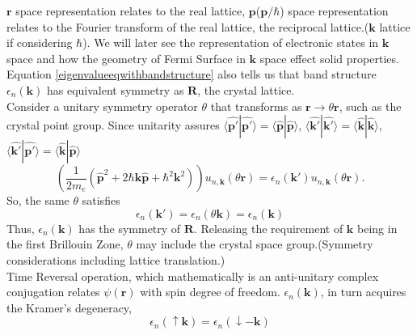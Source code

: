\documentclass{article}
\begin{document}
$\mathbf{r}$ space representation relates to the real lattice, $\mathbf{p}$($\mathbf{p}/\hbar$) space representation relates to  the Fourier transform of the real lattice, the reciprocal lattice.($\mathbf{k}$ lattice if considering $\hbar$). We will later see the representation of electronic states in $\mathbf{k}$ space and how the geometry of Fermi Surface in $\mathbf{k}$ space effect solid properties.\\
Equation \eqref{eigenvalueeqwithbandstructure} also tells us that band structure $\epsilon_{n}(\mathbf{k})$ has equivalent symmetry as $\mathbf{R}$, the crystal lattice.\\
Consider a unitary symmetry operator $\theta$ that transforms as  $\mathbf{r}\to\theta\mathbf{r}$, such as the crystal point group. Since unitarity assures $\langle\mathbf{\hat{p'}}|\mathbf{\hat{p'}}\rangle=\langle\mathbf{\hat{p}}|\mathbf{\hat{p}}\rangle$, $\langle\mathbf{\hat{k'}}|\mathbf{\hat{k'}}\rangle=\langle\mathbf{\hat{k}}|\mathbf{\hat{k}}\rangle$, $\langle\mathbf{\hat{k'}}|\mathbf{\hat{p'}}\rangle=\langle\mathbf{\hat{k}}|\mathbf{\hat{p}}\rangle$
\begin{equation}
	\left(\frac{1}{2m_{e}}\left(\mathbf{\hat{p}}^{2}+2\hbar\mathbf{k}\mathbf{\hat{p}}+\hbar^{2}\mathbf{k}^{2}\right)\right)u_{n,\mathbf{k}}(\theta\mathbf{r})=\epsilon_{n}(\mathbf{k'})u_{n,\mathbf{k}}(\theta\mathbf{r})\label{eigenfunctiontheta}.
\end{equation}
So, the same $\theta$ satisfies
\begin{equation}
	\epsilon_{n}(\mathbf{k}')=\epsilon_{n}(\theta\mathbf{k})=\epsilon_{n}(\mathbf{k})
\end{equation}
Thus, $\epsilon_{n}(\mathbf{k})$ has the symmetry of $\mathbf{R}$. Releasing the requirement of $\mathbf{k}$ being in the first Brillouin Zone, $\theta$ may include the crystal space group.(Symmetry considerations including lattice translation.)\\
Time Reversal operation, which mathematically is an anti-unitary complex conjugation relates $\psi(\mathbf{r})$ with spin degree of freedom. $\epsilon_{n}(\mathbf{k})$, in turn acquires the Kramer's degeneracy,
\begin{equation}
	\epsilon_{n}(\uparrow\mathbf{k})=\epsilon_{n}(\downarrow-\mathbf{k})
\end{equation}
\end{document}
